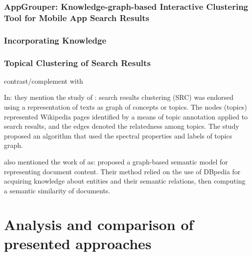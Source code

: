 \documentclass[runningheads]{llncs}
\begin{document}
\subsubsection{AppGrouper: Knowledge-graph-based Interactive Clustering Tool for Mobile App Search Results} \cite{Chang}

\subsubsection{Incorporating Knowledge }


\subsubsection{Topical Clustering of Search Results}
\cite{Scaiella} contrast/complement with \cite{Schuhmacher}

In: \cite{Elbattah} they mention the study of \cite{Scaiella}: search results clustering (SRC) was endorsed using a representation of texts as graph of concepts or topics. The nodes (topics) represented Wikipedia pages identified by a means of topic annotation applied to search results, and the edges denoted the relatedness among topics. The study proposed an algorithm that used the spectral properties and labels of topics graph. 

\cite{Elbattah} also mentioned the work of \cite{Schuhmacher} as: proposed a graph-based semantic model for representing document content. Their method relied on the use of DBpedia for acquiring knowledge about entities and their semantic relations, then computing a semantic similarity of documents.


\section{Analysis and comparison of presented approaches} \label{analysis}
\end{document}
